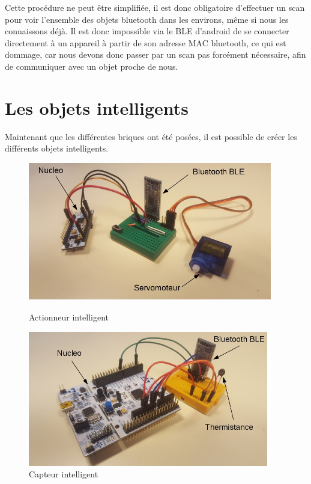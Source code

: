 Cette procédure ne peut être simplifiée, il est donc obligatoire d'effectuer un scan pour voir l'ensemble des 
objets bluetooth dans les environs, même si nous les connaissons déjà. Il est donc impossible via le BLE 
d'android de se connecter directement à un appareil à partir de son adresse MAC bluetooth, ce qui est 
dommage, car nous devons donc passer par un scan pas forcément nécessaire, afin de communiquer avec un objet 
proche de nous.


\section{Les objets intelligents}

Maintenant que les différentes briques ont été posées, il est possible de créer les différents objets
intelligents.

\begin{figure}[!tbp]
  \centering
  \begin{minipage}[b]{0.49\textwidth}
    \includegraphics[width=0.95\textwidth]{img/actuator2.jpg}
    \caption{Actionneur intelligent}
    \label{actuator}
  \end{minipage}
  \hfill
  \begin{minipage}[b]{0.49\textwidth}
    \includegraphics[width=0.95\textwidth]{img/sensor2.jpg}
    \caption{Capteur intelligent}
    \label{sensor}
  \end{minipage}
\end{figure}

